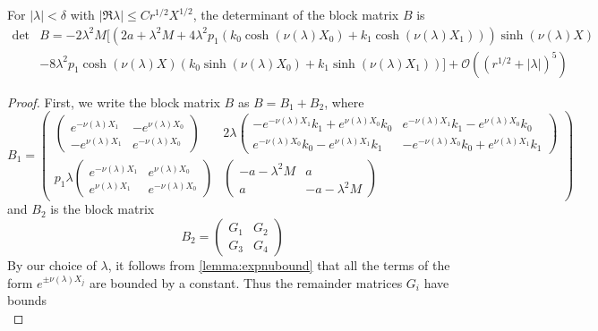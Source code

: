 \documentclass[thesis.tex]{subfiles}
\begin{document}
\begin{lemma}\label{2blockmatrix}
For $|\lambda| < \delta$ with $|\Re \lambda| \leq C r^{1/2}X^{1/2}$, the determinant of the block matrix $B$ is 
\begin{equation}
\begin{aligned}
\det &B = -2 \lambda^2 M \Big[ (2a + \lambda^2 M 
+ 4 \lambda^2 p_1(k_0 \cosh(\nu(\lambda)X_0) + k_1 \cosh(\nu(\lambda)X_1)  ) ) \sinh(\nu(\lambda)X)  \\
&- 8 \lambda^2 p_1 \cosh(\nu(\lambda)X) \left( k_0 \sinh(\nu(\lambda)X_0) 
+ k_1 \sinh(\nu(\lambda)X_1) \right) \Big]
+ \mathcal{O}( (r^{1/2} + |\lambda|)^5 )
\end{aligned}
\end{equation}
\begin{proof}
First, we write the block matrix $B$ as $B = B_1 + B_2$, where
\[
B_1 = \begin{pmatrix}
\begin{pmatrix}
e^{-\nu(\lambda)X_1} & -e^{\nu(\lambda)X_0} \\
-e^{\nu(\lambda)X_1} & e^{-\nu(\lambda)X_0} 
\end{pmatrix} &
2 \lambda \begin{pmatrix}
-e^{-\nu(\lambda)X_1} k_1 + e^{\nu(\lambda)X_0} k_0 & e^{-\nu(\lambda)X_1} k_1 - e^{\nu(\lambda)X_0} k_0 \\ e^{-\nu(\lambda)X_0} k_0 - e^{\nu(\lambda)X_1} k_1 & -e^{-\nu(\lambda)X_0} k_0 + e^{\nu(\lambda)X_1} k_1
\end{pmatrix} \\
p_1 \lambda
\begin{pmatrix}
e^{-\nu(\lambda)X_1} & e^{\nu(\lambda)X_0} \\
e^{\nu(\lambda)X_1} & e^{-\nu(\lambda)X_0} 
\end{pmatrix} &
\begin{pmatrix}
-a - \lambda^2 M & a \\
a & -a - \lambda^2 M
\end{pmatrix}
\end{pmatrix}
\]
and $B_2$ is the block matrix 
\[
B_2 = \begin{pmatrix}
G_1 & G_2 \\ G_3 & G_4
\end{pmatrix}
\]
By our choice of $\lambda$, it follows from \cref{lemma:expnubound} that all the terms of the form $e^{\pm \nu(\lambda)X_j}$ are bounded by a constant. Thus the remainder matrices $G_i$ have bounds
\begin{equation}\label{Gimatrixbounds}

\end{equation}
\end{proof}
\end{lemma}
\end{document}
